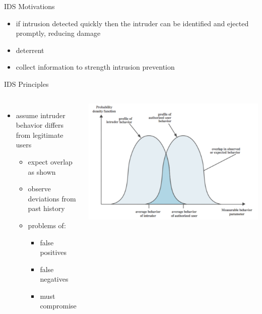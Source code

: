 \documentclass{beamer}
\begin{document}
\begin{frame}{IDS Motivations}
  \begin{itemize}
    \item if intrusion detected quickly then the intruder can be
      identified and ejected promptly, reducing damage
    \item deterrent
    \item collect information to strength intrusion prevention
  \end{itemize}
\end{frame}

\begin{frame}{IDS Principles}
  \begin{columns}[c]
  \begin{itemize}
  \item assume intruder behavior differs from legitimate 
    users 
    \begin{itemize}
    \item expect overlap as shown 
    \item observe deviations 
      from past history 
    \item problems of: 
      \begin{itemize}
      \item false positives 
      \item false negatives 
      \item must compromise 
      \end{itemize}
    \end{itemize}
  \end{itemize}
  \includegraphics[width=1\linewidth]{falsepositive}
  \end{columns}
\end{frame}
\end{document}
